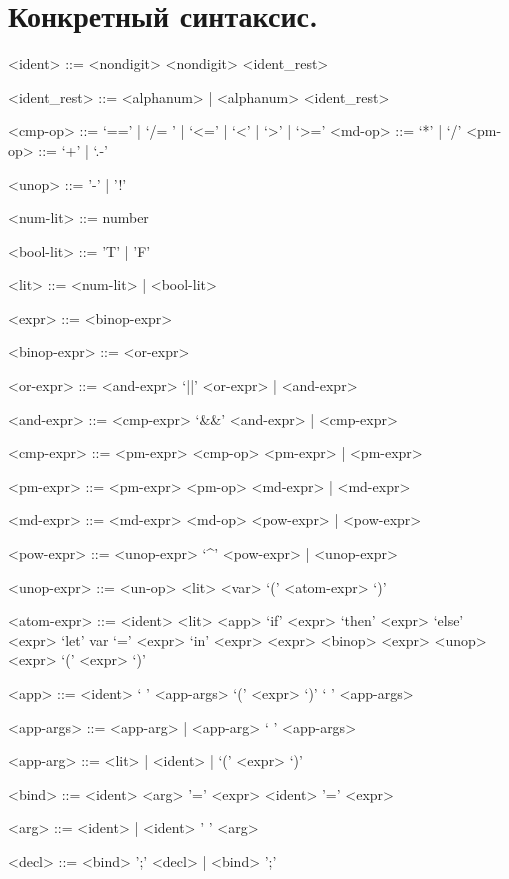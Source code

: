 \documentclass[12pt, a4paper] {ncc}
\begin{document}
\setcounter{figure}{0}

\section{Конкретный синтаксис.}
\begin{grammar}
<ident> ::= <nondigit>
\alt <nondigit> <ident_rest>

<ident_rest> ::= <alphanum> | <alphanum> <ident_rest>

<cmp-op> ::= `==' | `/= ' | `<=' | `<' | `>' | `>=' 
<md-op> ::= `*' | `/' 
<pm-op> ::= `+' | `.-' 

<unop> ::= '-' | '!'

<num-lit> ::= number

<bool-lit> ::= 'T' | 'F'

<lit> ::= <num-lit> | <bool-lit>

<expr> ::= <binop-expr>

<binop-expr> ::= <or-expr>

<or-expr> ::= <and-expr> `||' <or-expr> | <and-expr>

<and-expr> ::= <cmp-expr> `&&' <and-expr> | <cmp-expr>

<cmp-expr> ::= <pm-expr> <cmp-op> <pm-expr> | <pm-expr>

<pm-expr> ::= <pm-expr> <pm-op> <md-expr> | <md-expr>

<md-expr> ::= <md-expr> <md-op> <pow-expr> | <pow-expr>

<pow-expr> ::= <unop-expr> `^' <pow-expr> | <unop-expr>

<unop-expr> ::= <un-op> <lit>
 <var>
 `(' <atom-expr> `)'

<atom-expr> ::= <ident>
\alt <lit>
\alt <app>
\alt `if' <expr> `then' <expr> `else' <expr>
\alt `let' var `=' <expr> `in' <expr>
\alt  <expr> <binop> <expr>
\alt <unop> <expr>
\alt `(' <expr> `)'

<app> ::= <ident> ` ' <app-args>
\alt `(' <expr> `)' ` ' <app-args>

<app-args> ::= <app-arg> | <app-arg> ` ' <app-args>

<app-arg> ::= <lit> | <ident> | `(' <expr> `)'

<bind> ::= <ident> <arg> '=' <expr>
\alt <ident> '=' <expr>

<arg> ::= <ident> | <ident> ' ' <arg>

<decl> ::= <bind> ';' <decl> | <bind> ';'

\end{grammar}
\end{document}
